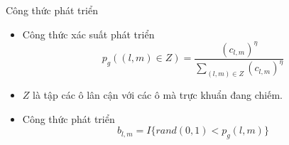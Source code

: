 \begin{frame}{Công thức phát triển}
\begin{itemize}
    \item Công thức xác suất phát triển
    \begin{equation}
    	p_g((l, m) \in Z) = \frac{(c_{l, m})^{\eta}}{\sum_{(l, m) \in Z}^{} (c_{l, m})^{\eta}}
	\end{equation}
	\item $Z$ là tập các ô lân cận với các ô mà trực khuẩn đang chiếm.
	\item Công thức phát triển
	\begin{equation}
		b_{l, m} = I\{rand(0, 1) < p_g(l, m)\}
	\end{equation}
\end{itemize}
\end{frame}